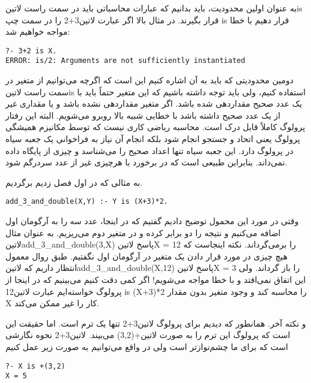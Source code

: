 به عنوان اولین محدودیت، باید بدانیم که عبارات محاسباتی باید در سمت راست ‌لاتین{is} قرار بگیرند. در مثال بالا اگر عبارت ‌لاتین{3+2} را در سمت چپ is قرار دهیم با خطا مواجه خواهیم شد:

\begin{latin}
\begin{lstlisting}
?- 3+2 is X.
ERROR: is/2: Arguments are not sufficiently instantiated
\end{lstlisting}
\end{latin}

دومین محدودیتی که باید به آن اشاره کنیم این است که اگرچه می‌توانیم از متغیر در سمت راست ‌لاتین{is} استفاده کنیم، ولی باید توجه داشته باشیم که این متغیر حتماً باید با یک عدد صحیح مقداردهی شده باشد. اگر متغیر مقداردهی نشده باشد و یا مقداری غیر از یک عدد صحیح داشته باشد با خطایی شبیه بالا روبرو می‌شویم. البته این رفتار پرولوگ کاملاً قابل درک است. محاسبه ریاضی کاری نیست که توسط مکانیزم همیشگی پرولوگ یعنی اتحاد و جستجو انجام شود بلکه انجام آن نیاز به فراخوانی یک جعبه سیاه در پرولوگ دارد. این جعبه سیاه تنها اعداد صحیح را می‌شناسد و چیزی از پایگاه داده نمی‌داند. بنابراین طبیعی است که در برخورد با هرچیزی غیر از عدد سردرگم شود.

به مثالی که در اول فصل زدیم برگردیم.

\begin{latin}
\begin{lstlisting}
add_3_and_double(X,Y) :- Y is (X+3)*2.
\end{lstlisting}
\end{latin}

وقتی در مورد این محمول توضیح دادیم گفتیم که در اینجا، عدد سه را به آرگومان اول اضافه می‌کنیم و نتیجه را دو برابر کرده و در متغیر دوم می‌ریزیم. به عنوان مثال ‌لاتین{add\_3\_and\_double(3,X)} پاسخ ‌لاتین{X = 12} را برمی‌گرداند. نکته اینجاست که هیچ چیزی در مورد قرار دادن یک متغیر در آرگومان اول نگفتیم. طبق روال معمول انتظار داریم که ‌لاتین{add\_3\_and\_double(X,12)} پاسخ ‌لاتین{X = 3} را باز گرداند. ولی این اتفاق نمی‌افتد و با خطا مواجه می‌شویم! اگر کمی دقت کنیم می‌بینیم که در اینجا از پرولوگ خواسته‌ایم عبارت ‌لاتین{12 is (X+3)*2} را محاسبه کند و وجود متغیر بدون مقدار X کار را غیر ممکن می‌کند.

و نکته آخر. همانطور که دیدیم برای پرولوگ ‌لاتین{3+2} تنها یک ترم است. اما حقیقت این است که پرولوگ این ترم را به صورت ‌لاتین{+(3,2)} می‌بیند. ‌لاتین{3+2} نحوه نگارشی است که برای ما چشم‌نوازتر است ولی در واقع می‌توانیم به صورت زیر عمل کنیم

\begin{latin}
\begin{lstlisting}
?- X is +(3,2)
X = 5
\end{lstlisting}
\end{latin}

